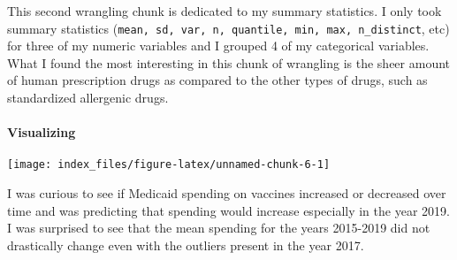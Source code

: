 \documentclass[
]{article}
\newenvironment{Shaded}{\begin{snugshade}}{\end{snugshade}}
\newcommand{\DataTypeTok}[1]{\textcolor[rgb]{0.13,0.29,0.53}{#1}}
\newcommand{\DecValTok}[1]{\textcolor[rgb]{0.00,0.00,0.81}{#1}}
\newcommand{\FloatTok}[1]{\textcolor[rgb]{0.00,0.00,0.81}{#1}}
\newcommand{\KeywordTok}[1]{\textcolor[rgb]{0.13,0.29,0.53}{\textbf{#1}}}
\newcommand{\NormalTok}[1]{#1}
\newcommand{\OperatorTok}[1]{\textcolor[rgb]{0.81,0.36,0.00}{\textbf{#1}}}
\newcommand{\StringTok}[1]{\textcolor[rgb]{0.31,0.60,0.02}{#1}}
\begin{document}
This second wrangling chunk is dedicated to my summary statistics. I
only took summary statistics
(\texttt{mean,\ sd,\ var,\ n,\ quantile,\ min,\ max,\ n\_distinct}, etc)
for three of my numeric variables and I grouped 4 of my categorical
variables. What I found the most interesting in this chunk of wrangling
is the sheer amount of human prescription drugs as compared to the other
types of drugs, such as standardized allergenic drugs.

\hypertarget{visualizing}{%
\paragraph{Visualizing}\label{visualizing}}

\begin{Shaded}
\end{Shaded}

\begin{center}\texttt{[image: index\_files/figure-latex/unnamed-chunk-6-1]} \end{center}

I was curious to see if Medicaid spending on vaccines increased or
decreased over time and was predicting that spending would increase
especially in the year 2019. I was surprised to see that the mean
spending for the years 2015-2019 did not drastically change even with
the outliers present in the year 2017.
\end{document}
